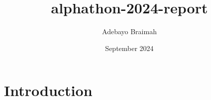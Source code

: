 \documentclass{article}
\title{alphathon-2024-report}
\author{Adebayo Braimah}
\date{September 2024}
\begin{document}
\maketitle

\section{Introduction}
\end{document}

